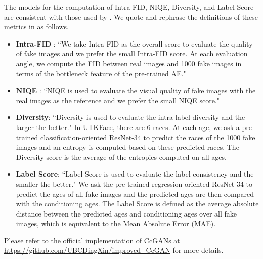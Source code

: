 \documentclass[final,12pt, 3p,times]{elsarticle}
\begin{document}
The models for the computation of Intra-FID, NIQE, Diversity, and Label Score are consistent with those used by \cite{ding2021ccgan, ding2020continuous}. We quote and rephrase the definitions of these metrics in \cite{ding2021ccgan, ding2020continuous} as follows.
\begin{itemize}
	\item \textbf{Intra-FID} \cite{miyato2018cgans}: ``We take Intra-FID as the overall score to evaluate the quality of fake images and we prefer the small Intra-FID score. At each evaluation angle, we compute the FID \cite{heusel2017gans} between real images and 1000 fake images in terms of the bottleneck feature of the pre-trained AE."
	
	\item \textbf{NIQE} \cite{mittal2012making}: ``NIQE is used to evaluate the visual quality of fake images with the real images as the reference and we prefer the small NIQE score."
	
	\item \textbf{Diversity}: ``Diversity is used to evaluate the intra-label diversity and the larger the better." In UTKFace, there are 6 races. At each age, we ask a pre-trained classification-oriented ResNet-34 to predict the races of the 1000 fake images and an entropy is computed based on these predicted races. The Diversity score is the average of the entropies computed on all ages. 
	
	\item \textbf{Label Score}: ``Label Score is used to evaluate the label consistency and the smaller the better." We ask the pre-trained regression-oriented ResNet-34 to predict the ages of all fake images and the predicted ages are then compared with the conditioning ages. The Label Score is defined as the average absolute distance between the predicted ages and conditioning ages over all fake images, which is equivalent to the Mean Absolute Error (MAE). 
\end{itemize}
Please refer to the official implementation of CcGANs at \url{https://github.com/UBCDingXin/improved_CcGAN} for more details. 
\end{document}
